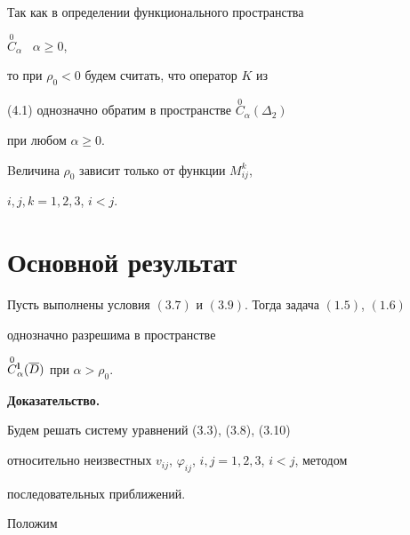 \begin{note}


Так как в определении функционального пространства


$\overset{0}{C}_{\alpha}$ \ $\alpha \geq 0$,


то при $\rho_0 < 0$ будем считать, что оператор $K$ из


(4.1) однозначно обратим в пространстве $\overset{0}{C}_{\alpha}(\Delta_2)$


при любом $\alpha \geq 0$.


\end{note}





\begin{note}


Bеличина $\rho_0$ зависит только от функции $M_{ij}^k$,


$i,j,k=1,2,3$, $i<j$.


\end{note}








\section{Основной результат}





\begin{thmnonum}


Пусть выполнены условия $(3.7)$ и $(3.9)$. Тогда задача $(1.5)$, $(1.6)$


однозначно разрешима в пространстве


$\overset{0}{C}{}_{\alpha}^{\bold{l}}(\overline D)$ при $\alpha > \rho_0$.


\end{thmnonum}





{\bf Доказательство.}


Будем решать систему уравнений (3.3), (3.8), (3.10)


относительно неизвестных $v_{ij}$, $\varphi_{ij}$, $i,j=1,2,3$, $i<j$, методом


последовательных приближений.





Положим




